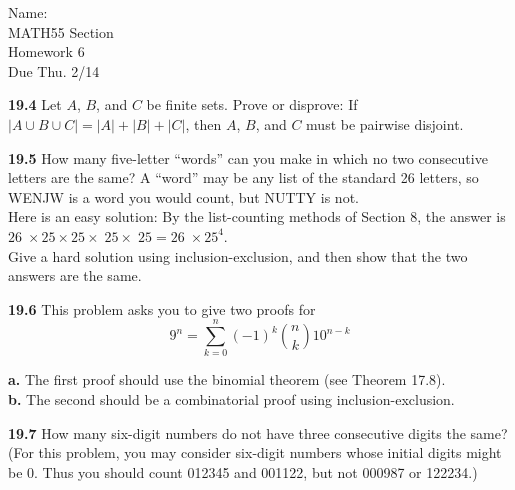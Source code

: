 \documentclass[10pt]{article}
\begin{document}
\begin{flushright}
	Name: \underline{\hspace{3cm}} \\
	MATH55 Section \underline{\hspace{0.5cm}} \\
	Homework 6 \\
	Due Thu. 2/14
\end{flushright}

\begin{framed}
    \textbf{19.4} Let $A$, $B$, and $C$ be finite sets. Prove or disprove: 
    If $|A\cup B \cup C | = |A| + |B| + |C|$,
    then $A$, $B$, and $C$ must be pairwise disjoint.
\end{framed}

\pagebreak

\begin{framed}
    \textbf{19.5} How many five-letter “words” can you make 
    in which no two consecutive letters are
    the same?
    A “word” may be any list of the standard 26 letters, so WENJW is a word you would count, 
    but NUTTY is not.\\

    Here is an easy solution: By the list-counting methods of Section 8, the answer is
    $26 􏰂\times 25 \times 25 \times􏰂 25 \times􏰂 25 = 26 􏰂\times 25^4$.\\

    Give a hard solution using inclusion-exclusion, and then show that the two answers are the same.
\end{framed}

\pagebreak

\begin{framed}
    \textbf{19.6} This problem asks you to give two proofs for
    $$
    9^n = \sum_{k=0}^{n} (-1)^k \binom{n}{k} 10^{n-k}
    $$

    \indent \textbf{a.} The first proof should use the binomial theorem (see Theorem 17.8).\\
    \indent \textbf{b.} The second should be a combinatorial proof using inclusion-exclusion.

\end{framed}

\pagebreak

\begin{framed}
    \textbf{19.7} How many six-digit numbers do not have three consecutive digits the same? 
    (For this problem, you may consider six-digit numbers whose initial digits might be 0. Thus you
    should count 012345 and 001122, but not 000987 or 122234.)
\end{framed}
\end{document}
